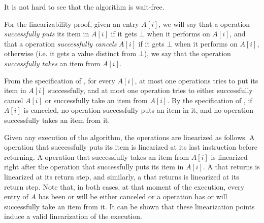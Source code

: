 \begin{proofT}
It is not hard to see that the algorithm is wait-free.

For the linearizability proof, given an entry $A[i]$, we will say that a \Put operation \emph{successfully puts} its item in $A[i]$ if it gets $\bot$ when it performs \SWAP on $A[i]$, and that a \Take operation \emph{successfully cancels} $A[i]$ if it gets $\bot$ when it performs \SWAP on $A[i]$, otherwise (i.e. it gets a value distinct from $\bot$), we say that the \Take operation \emph{successfully takes} an item from $A[i]$.

From the specification of \FAI, for every $A[i]$, at most one \Put operations tries to put its item in $A[i]$ successfully, and at most one \Take operation tries to either successfully cancel $A[i]$ or successfully take an item from $A[i]$. By the specification of \SWAP, if $A[i]$ is canceled, no \Put operation successfully puts an item in it, and no \Take operation successfully takes an item from it.

Given any execution of the algorithm, the operations are linearized as follows. A \Put operation that successfully puts its item is linearized at its last \FAI instruction before returning. A \Take operation that successfully takes an item from $A[i]$ is linearized right after the \Put operation that successfully puts its item in $A[i]$. A \Put that returns \full is linearized at its return step, and similarly, a \Take that returns \closed is linearized at its return step. Note that, in both cases, at that moment of the execution, every entry of $A$ has been or will be either canceled or a \Take operation has or will successfully take an item from it. It can be shown that these linearization points induce a valid linearization of the execution.
\end{proofT}

